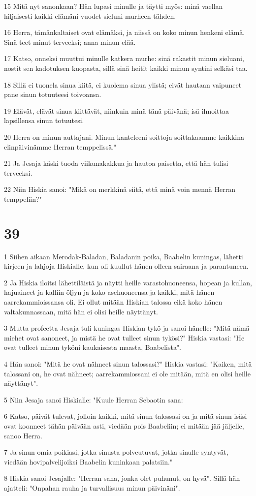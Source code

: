 \par 15 Mitä nyt sanonkaan? Hän lupasi minulle ja täytti myös: minä vaellan hiljaisesti kaikki elämäni vuodet sieluni murheen tähden.
\par 16 Herra, tämänkaltaiset ovat elämäksi, ja niissä on koko minun henkeni elämä. Sinä teet minut terveeksi; anna minun elää.
\par 17 Katso, onneksi muuttui minulle katkera murhe: sinä rakastit minun sieluani, nostit sen kadotuksen kuopasta, sillä sinä heitit kaikki minun syntini selkäsi taa.
\par 18 Sillä ei tuonela sinua kiitä, ei kuolema sinua ylistä; eivät hautaan vaipuneet pane sinun totuuteesi toivoansa.
\par 19 Elävät, elävät sinua kiittävät, niinkuin minä tänä päivänä; isä ilmoittaa lapsillensa sinun totuutesi.
\par 20 Herra on minun auttajani. Minun kanteleeni soittoja soittakaamme kaikkina elinpäivinämme Herran temppelissä."
\par 21 Ja Jesaja käski tuoda viikunakakkua ja hautoa paisetta, että hän tulisi terveeksi.
\par 22 Niin Hiskia sanoi: "Mikä on merkkinä siitä, että minä voin mennä Herran temppeliin?"

\chapter{39}

\par 1 Siihen aikaan Merodak-Baladan, Baladanin poika, Baabelin kuningas, lähetti kirjeen ja lahjoja Hiskialle, kun oli kuullut hänen olleen sairaana ja parantuneen.
\par 2 Ja Hiskia iloitsi lähettiläistä ja näytti heille varastohuoneensa, hopean ja kullan, hajuaineet ja kalliin öljyn ja koko asehuoneensa ja kaikki, mitä hänen aarrekammioissansa oli. Ei ollut mitään Hiskian talossa eikä koko hänen valtakunnassaan, mitä hän ei olisi heille näyttänyt.
\par 3 Mutta profeetta Jesaja tuli kuningas Hiskian tykö ja sanoi hänelle: "Mitä nämä miehet ovat sanoneet, ja mistä he ovat tulleet sinun tykösi?" Hiskia vastasi: "He ovat tulleet minun tyköni kaukaisesta maasta, Baabelista".
\par 4 Hän sanoi: "Mitä he ovat nähneet sinun talossasi?" Hiskia vastasi: "Kaiken, mitä talossani on, he ovat nähneet; aarrekammiossani ei ole mitään, mitä en olisi heille näyttänyt".
\par 5 Niin Jesaja sanoi Hiskialle: "Kuule Herran Sebaotin sana:
\par 6 Katso, päivät tulevat, jolloin kaikki, mitä sinun talossasi on ja mitä sinun isäsi ovat koonneet tähän päivään asti, viedään pois Baabeliin; ei mitään jää jäljelle, sanoo Herra.
\par 7 Ja sinun omia poikiasi, jotka sinusta polveutuvat, jotka sinulle syntyvät, viedään hovipalvelijoiksi Baabelin kuninkaan palatsiin."
\par 8 Hiskia sanoi Jesajalle: "Herran sana, jonka olet puhunut, on hyvä". Sillä hän ajatteli: "Onpahan rauha ja turvallisuus minun päivinäni".

